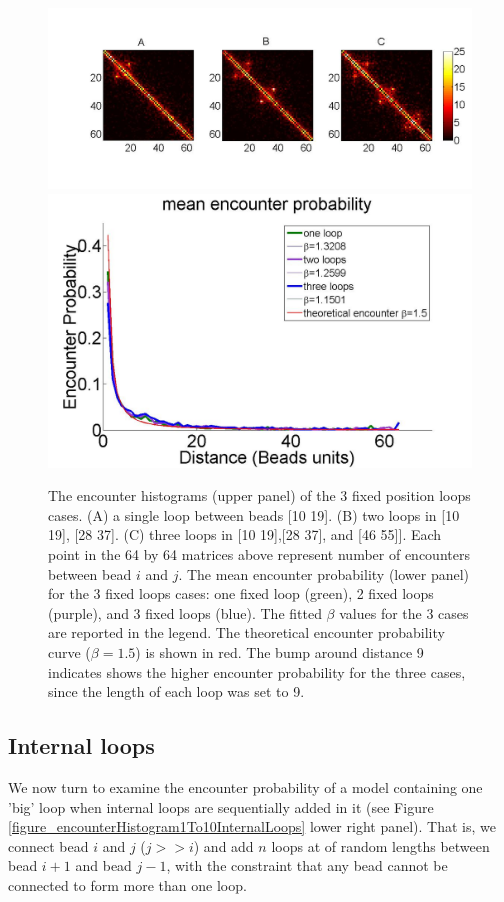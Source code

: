 \documentclass[12pt]{book}
\begin{document}
\begin{figure}[H]
\centering
\hspace{-72pt}
\vspace{-40pt}
\includegraphics[scale=0.4]{encounterHistogram123Loops}
\includegraphics[scale=0.2]{meanEncounterProbability123Loops}
\caption{\scriptsize{The encounter histograms (upper panel) of the 3 fixed position loops cases. (A) a single loop between beads [10 19]. (B) two loops in [10 19], [28 37]. (C) three loops in [10 19],[28 37], and [46 55]]. Each point in the 64 by 64 matrices above represent number of encounters between bead $i$ and $j$. The mean encounter probability (lower panel) for the 3 fixed loops cases: one fixed loop (green), 2 fixed loops (purple), and 3 fixed loops (blue). The fitted $\beta$ values  for the 3 cases are reported in the legend. The theoretical encounter probability curve ($\beta=1.5$) is shown in red. The bump around distance 9 indicates shows the higher encounter probability for the three cases, since the length of each loop was set to 9.}}
\label{figure_encounterHistogram123Loops}
\end{figure}


\subsection{Internal loops}\label{subsection_internalLoops}
We now turn to examine the encounter probability of a model containing one 'big' loop when internal loops are sequentially added in it (see Figure \ref{figure_encounterHistogram1To10InternalLoops} lower right panel).  
That is, we connect bead $i$ and $j$ ($j>>i$) and add $n$ loops at of random lengths between bead $i+1$ and bead $j-1$, with the constraint that any bead cannot be connected to form more than one loop. 
\end{document}

